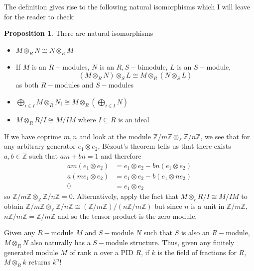 \documentclass[12pt,reqno]{amsart}
\numberwithin{theorem}{section}
\theoremstyle{definition}
\theoremstyle{remark}
\numberwithin{equation}{section}
\newcommand{\Z}{\mathbb Z}
\theoremstyle{definition}
\newtheorem{prop}[theorem]{Proposition}
\begin{document}
The definition gives rise to the following natural isomorphisms which I will leave for the reader to check:
\begin{prop}
    There are natural isomorphisms
    \begin{itemize}
        \item $M\otimes_R N \cong N\otimes_R M$
        \item If $M$ is an $R-$modules, $N$ is an $R,S-$bimodule, $L$ is an $S-$module,
        $$(M\otimes_RN)\otimes_S L \cong M\otimes_R(N\otimes_S L)$$
        as both $R-$modules and $S-$modules
        \item $\bigoplus_{i \in I} M \otimes_R N_i \cong M \otimes_R (\bigoplus_{i \in I} N)$
        \item $M \otimes_R R/I \cong M/IM $ where $I \subseteq R$ is an ideal
    \end{itemize}
\end{prop}
\begin{example}
    If we have coprime $m,n$ and look at the module $\Z/m\Z\otimes_\Z \Z/n\Z$, we see that for any arbitrary generator $e_1\otimes e_2$, Bézout's theorem tells us that there exists $a,b \in \Z$ such that $am+bn = 1$ and therefore
    \begin{align*}
       am(e_1\otimes e_2) &= e_1\otimes e_2 - bn(e_1\otimes e_2) \\
       a(me_1\otimes e_2) &= e_1\otimes e_2 - b(e_1\otimes ne_2) \\
       0 &= e_1\otimes e_2
    \end{align*}
    so $\Z/m\Z\otimes_\Z \Z/n\Z = 0$. Alternatively, apply the fact that $M\otimes_r R/I \cong M/IM$ to obtain $\Z/m\Z\otimes_\Z \Z/n\Z\cong (\Z/m\Z)/(n\Z/m\Z)$ but since $n$ is a unit in $\Z/m\Z$, $n\Z/m\Z = \Z/m\Z$ and so the tensor product is the zero module.
\end{example}
\begin{example}
    Given any $R-$module $M$ and $S-$module $N$ such that $S$ is also an $R-$module, $M\otimes_R N$ also naturally has a $S-$module structure. Thus, given any finitely generated module $M$ of rank $n$ over a PID $R$, if $k$ is the field of fractions for $R$, $M\otimes_R k$ returns $k^n$!
\end{example}
\end{document}
